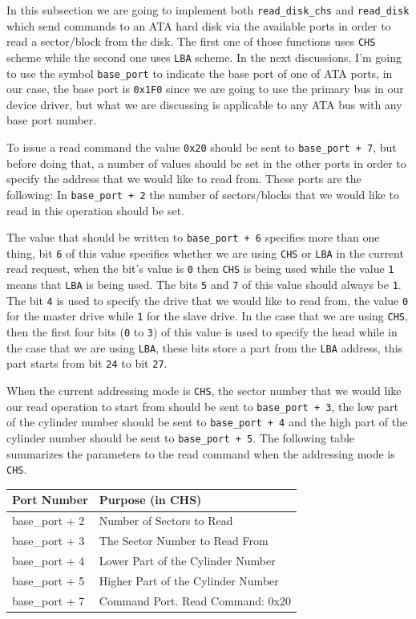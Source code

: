 In this subsection we are going to implement both
\lstinline!read_disk_chs! and \lstinline!read_disk! which send commands
to an ATA hard disk via the available ports in order to read a
sector/block from the disk. The first one of those functions uses
\lstinline!CHS! scheme while the second one uses \lstinline!LBA! scheme.
In the next discussions, I'm going to use the symbol
\lstinline!base_port! to indicate the base port of one of ATA ports, in
our case, the base port is \lstinline!0x1F0! since we are going to use
the primary bus in our device driver, but what we are discussing is
applicable to any ATA bus with any base port number.

To issue a read command the value \lstinline!0x20! should be sent to
\lstinline!base_port + 7!, but before doing that, a number of values
should be set in the other ports in order to specify the address that we
would like to read from. These ports are the following: In
\lstinline!base_port + 2! the number of sectors/blocks that we would
like to read in this operation should be set.

The value that should be written to \lstinline!base_port + 6! specifies
more than one thing, bit \lstinline!6! of this value specifies whether
we are using \lstinline!CHS! or \lstinline!LBA! in the current read
request, when the bit's value is \lstinline!0! then \lstinline!CHS! is
being used while the value \lstinline!1! means that \lstinline!LBA! is
being used. The bits \lstinline!5! and \lstinline!7! of this value
should always be \lstinline!1!. The bit \lstinline!4! is used to specify
the drive that we would like to read from, the value \lstinline!0! for
the master drive while \lstinline!1! for the slave drive. In the case
that we are using \lstinline!CHS!, then the first four bits
(\lstinline!0! to \lstinline!3!) of this value is used to specify the
head while in the case that we are using \lstinline!LBA!, these bits
store a part from the \lstinline!LBA! address, this part starts from bit
\lstinline!24! to bit \lstinline!27!.

When the current addressing mode is \lstinline!CHS!, the sector number
that we would like our read operation to start from should be sent to
\lstinline!base_port + 3!, the low part of the cylinder number should be
sent to \lstinline!base_port + 4! and the high part of the cylinder
number should be sent to \lstinline!base_port + 5!. The following table
summarizes the parameters to the read command when the addressing mode
is \lstinline!CHS!.

\begin{longtable}[]{@{}ll@{}}
\toprule
Port Number & Purpose (in CHS)\tabularnewline
\midrule
\endhead
base\_port + 2 & Number of Sectors to Read\tabularnewline
base\_port + 3 & The Sector Number to Read From\tabularnewline
base\_port + 4 & Lower Part of the Cylinder Number\tabularnewline
base\_port + 5 & Higher Part of the Cylinder Number\tabularnewline
base\_port + 7 & Command Port. Read Command: 0x20\tabularnewline
\bottomrule
\end{longtable}

